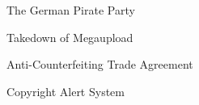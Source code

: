 \documentclass{beamer}
\begin{document}
\begin{frame}{The German Pirate Party}
\end{frame}

\begin{frame}{Takedown of Megaupload}
\end{frame}

\begin{frame}{Anti-Counterfeiting Trade Agreement}
\end{frame}

\begin{frame}{Copyright Alert System}
\end{frame}
\end{document}
